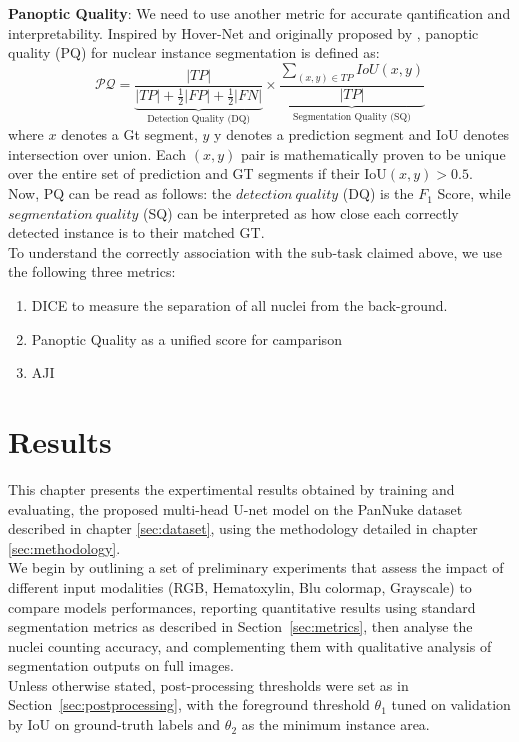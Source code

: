 \documentclass[target=bach,aauheader=,style=]{thud}
\begin{document}
\textbf{Panoptic Quality}: We need to use another metric for accurate qantification and interpretability. Inspired by Hover-Net and originally proposed by \cite{kirillov2019panoptic}, panoptic quality (PQ) for nuclear instance segmentation is defined as:
\begin{equation}
\mathcal{PQ} =
\underbrace{\frac{|TP|}
{|TP| + \tfrac{1}{2}|FP| + \tfrac{1}{2}|FN|}}_{\text{Detection Quality (DQ)}}
\times
\underbrace{\frac{\sum_{(x,y) \in TP} IoU(x,y)}
{|TP|}}_{\text{Segmentation Quality (SQ)}}
\end{equation}
where $x$ denotes a Gt segment, $y$ y denotes a prediction segment and IoU denotes intersection over union. Each $(x,y)$ pair is mathematically proven to be unique over the entire set of prediction and GT segments if their IoU$(x,y)>0.5$. \\
Now, PQ can be read as follows: the $detection\ quality$ (DQ) is the $F_1$ Score, while $segmentation\ quality$ (SQ) can be interpreted as how close each correctly detected instance is to their matched GT.\\

To understand the correctly association with the sub-task claimed above, we use the following three metrics:
\begin{enumerate}
    \item DICE to measure the separation of all nuclei from the back-ground.
    \item Panoptic Quality as a unified score for camparison
    \item AJI
\end{enumerate}
\chapter{Results}
\label{chap:results}

This chapter presents the expertimental results obtained by training and evaluating, the proposed multi-head U-net model on the PanNuke dataset described in chapter \ref{sec:dataset}, using the methodology detailed in chapter \ref{sec:methodology}.\\
We begin by outlining a set of preliminary experiments that assess the impact of different input modalities (RGB, Hematoxylin, Blu colormap, Grayscale) to compare models performances, reporting quantitative results using standard segmentation metrics as described in Section~\ref{sec:metrics}, then analyse the nuclei counting accuracy, and complementing them with qualitative analysis of segmentation outputs on full images.\\
Unless otherwise stated, post-processing thresholds were set as in Section~\ref{sec:postprocessing}, with the foreground threshold $\theta_1$ tuned on validation by IoU on ground-truth labels and $\theta_2$ as the minimum instance area.
\end{document}
